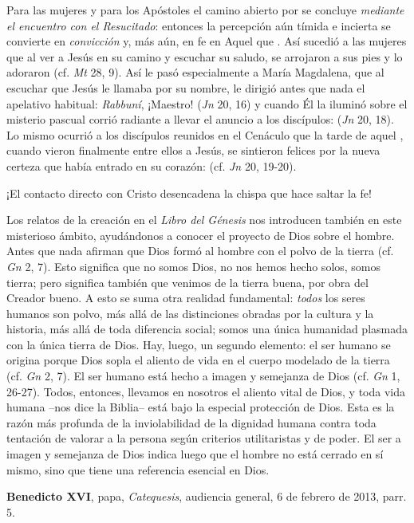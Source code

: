 \begin{body}
Para las mujeres y para los Apóstoles el camino abierto por  se concluye \textit{mediante el encuentro con el Resucitado}: entonces la percepción aún tímida e incierta se convierte en \textit{convicción} y, más aún, en fe en Aquel que . Así sucedió a las mujeres que al ver a Jesús en su camino y escuchar su saludo, se arrojaron a sus pies y lo adoraron (cf. \textit{Mt} 28, 9). Así le pasó especialmente a María Magdalena, que al escuchar que Jesús le llamaba por su nombre, le dirigió antes que nada el apelativo habitual: \textit{Rabbuní}, ¡Maestro! (\textit{Jn} 20, 16) y cuando Él la iluminó sobre el misterio pascual corrió radiante a llevar el anuncio a los discípulos:  (\textit{Jn} 20, 18). Lo mismo ocurrió a los discípulos reunidos en el Cenáculo que la tarde de aquel , cuando vieron finalmente entre ellos a Jesús, se sintieron felices por la nueva certeza que había entrado en su corazón:  (cf. \textit{Jn} 20, 19-20).

¡El contacto directo con Cristo desencadena la chispa que hace saltar la fe!
\end{body}

\begin{patercite}
Los relatos de la creación en el \textit{Libro del Génesis} nos introducen también en este misterioso ámbito, ayudándonos a conocer el proyecto de Dios sobre el hombre. Antes que nada afirman que Dios formó al hombre con el polvo de la tierra (cf. \textit{Gn} 2, 7). Esto significa que no somos Dios, no nos hemos hecho solos, somos tierra; pero significa también que venimos de la tierra buena, por obra del Creador bueno. A esto se suma otra realidad fundamental: \textit{todos} los seres humanos son polvo, más allá de las distinciones obradas por la cultura y la historia, más allá de toda diferencia social; somos una única humanidad plasmada con la única tierra de Dios. Hay, luego, un segundo elemento: el ser humano se origina porque Dios sopla el aliento de vida en el cuerpo modelado de la tierra (cf. \textit{Gn} 2, 7). El ser humano está hecho a imagen y semejanza de Dios (cf. \textit{Gn} 1, 26-27). Todos, entonces, llevamos en nosotros el aliento vital de Dios, y toda vida humana --nos dice la Biblia-- está bajo la especial protección de Dios. Esta es la razón más profunda de la inviolabilidad de la dignidad humana contra toda tentación de valorar a la persona según criterios utilitaristas y de poder. El ser a imagen y semejanza de Dios indica luego que el hombre no está cerrado en sí mismo, sino que tiene una referencia esencial en Dios.

\textbf{Benedicto XVI}, papa, \textit{Catequesis}, audiencia general, 6 de febrero de 2013, parr. 5. 
\end{patercite}

